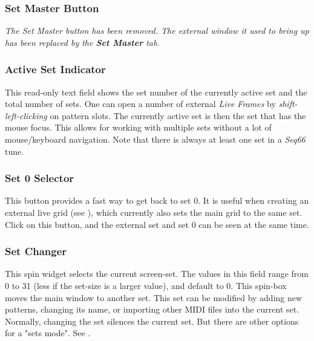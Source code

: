 \subsubsection{Set Master Button}
\label{subsubsec:introduction_set_master_button}

   \textsl{The Set Master button has been removed.
   The external window it used to bring up has been replaced
   by the \textbf{Set Master} tab.}

\subsubsection{Active Set Indicator}
\label{subsubsec:introduction_active_set_indicator}

   This read-only text field shows the set number of the currently active set
   and the total number of sets.
   One can open a number of external \textsl{Live Frames} by
   \textsl{shift-left-clicking} on pattern slots.
   The currently active set is then the
   set that has the mouse focus.  This allows for working with multiple sets
   without a lot of mouse/keyboard navigation.
   Note that there is always at least one set in a \textsl{Seq66}
   tune.

\subsubsection{Set 0 Selector}
\label{subsubsec:introduction_set_zero}

   This button provides a fast way to get back to set 0.
   It is useful when creating an external live grid
   (see ),
   which currently also sets the main grid to the same set.
   Click on this button, and the external set and set 0 can be seen at the same
   time.

\subsubsection{Set Changer}
\label{subsubsec:introduction_set_changer}

   This spin widget selects the current screen-set.  The values in this
   field range from 0 to 31 (less if the set-size is a larger value),
   and default to 0.
   This spin-box moves the main window to another set.
   This set can be modified by adding new patterns, changing its name, or
   importing other MIDI files into the current set.
   Normally, changing the set silences the current set.
   But there are other options for a "sets mode".
   See .

